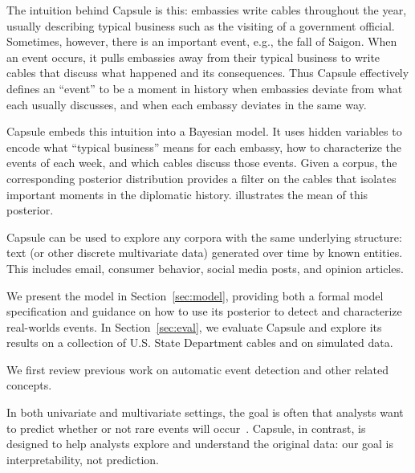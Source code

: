 The intuition behind Capsule is this: embassies write cables
throughout the year, usually describing typical business such as the
visiting of a government official. Sometimes, however, there is an
important event, e.g., the fall of Saigon. When an event occurs, it
pulls embassies away from their typical business to write cables that
discuss what happened and its consequences. Thus Capsule effectively
defines an ``event'' to be a moment in history when embassies deviate
from what each usually discusses, and when each embassy deviates in
the same way.

Capsule embeds this intuition into a Bayesian model. It uses hidden
variables to encode what ``typical business'' means for each embassy,
how to characterize the events of each week, and which cables discuss
those events. Given a corpus, the corresponding posterior distribution
provides a filter on the cables that isolates important moments in the
diplomatic history.  illustrates the mean of this
posterior.

Capsule can be used to explore any corpora with the same underlying
structure: text (or other discrete multivariate data) generated over time by known entities.  This includes
email, consumer behavior, social media posts, and opinion articles.

We present the model in Section~\ref{sec:model}, providing both a formal
model specification and guidance on how to use its posterior to detect 
and characterize real-worlds events.
In Section~\ref{sec:eval}, we evaluate Capsule and explore its results on
a collection of U.S. State Department cables and on simulated data.

 We first review previous work on automatic
event detection and other related concepts.

In both univariate and multivariate settings, the goal is often that analysts want to predict whether or not rare events will occur~\cite{weiss1998learning,das2008anomaly}.  Capsule, in contrast, is designed to help analysts explore and understand the original data: our goal is interpretability, not prediction.

